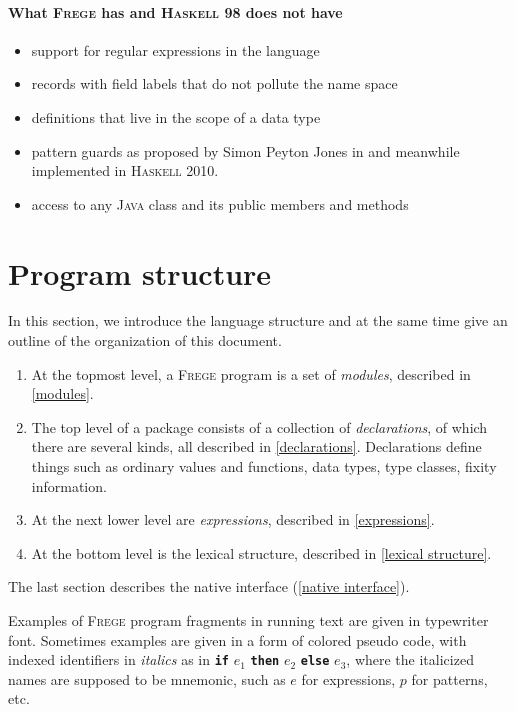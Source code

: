 \documentclass[letterpaper,12pt]{report}
\newcommand{\haskell}[0]{\textsc{Haskell}}
\newcommand{\frege}[0]{\textsc{Frege}}
\newcommand{\java}[0]{\textsc{Java}}
\newcommand{\term}[1]{\textbf{\texttt{\textcolor{trmred}{#1}}}}
\begin{document}
\paragraph{What \frege{} has and \haskell{} 98 does not have}
\begin{itemize}
\item support for regular expressions in the language
\item records with field labels that do not pollute the name space
\item definitions that live in the scope of a data type
\item pattern guards as proposed by Simon Peyton Jones in \cite{pguards}
and meanwhile implemented in \haskell{} 2010.
\item access to any \java{} class and its public members and methods
\end{itemize}

\section{Program structure}

In this section, we introduce the language structure and at the
same time give an outline of the organization of this
document.

\begin{enumerate}

\item At the topmost level, a \frege{} program is a set of
\emph{modules}, described in \autoref{modules}.

\item The top level of a package consists of a collection of
\emph{declarations},
of which there are several kinds, all described in
\autoref{declarations}.
Declarations define things such as ordinary values and functions,
data types,
type classes, fixity information.

\item At the next lower level are \emph{expressions}, described in
\autoref{expressions}.

\item At the bottom level is the lexical structure, described in
\autoref{lexical structure}.

\end{enumerate}

The last section describes  the native interface
(\autoref{native interface}).

Examples of \frege{} program fragments in running text are given in
typewriter font. Sometimes examples are given in a form of
colored pseudo code,
with indexed identifiers in \emph{italics} as in \term{if} $e_1$
\term{then} $e_2$ \term{else} $e_3$, where the  italicized names are
supposed to be mnemonic, such as $e$ for expressions, $p$ for patterns,
etc.
\end{document}
